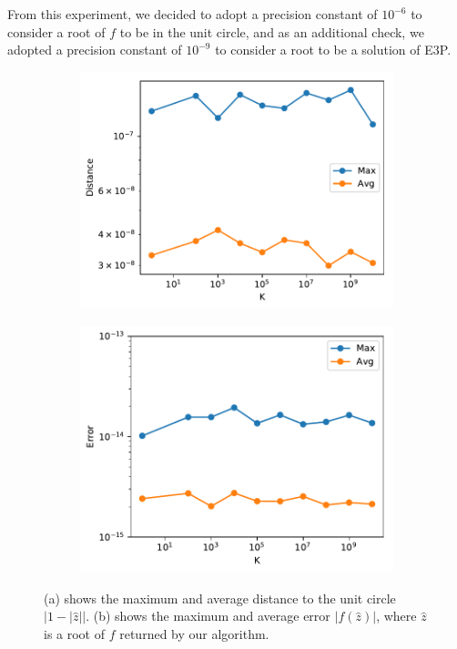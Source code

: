 From this experiment, we decided to adopt a precision constant of $10^{-6}$ to consider a root of $f$ to be in the unit circle, and as an additional check, we adopted a precision constant of $10^{-9}$ to consider a root to be a solution of E3P.

\begin{figure}
	
	\begin{subfigure}{.5\textwidth}
		\centering

		\includegraphics[scale=.5]{../tex/figures/e3p_known_sols2}
		\caption{}
		\label{fig:e3p_known_sols2}
	\end{subfigure}
	\begin{subfigure}{.5\textwidth}
	\centering
	
	\includegraphics[scale=.5]{../tex/figures/e3p_known_sols1}
	\caption{}
	\label{fig:e3p_known_sols1}
	\end{subfigure}
\caption{(a) shows the maximum and average distance to the unit circle $|1-|\hat{z}||$. (b) shows the maximum and average error $|f(\hat{z})|$, where $\hat{z}$ is a root of $f$ returned by our algorithm.}
\end{figure}

